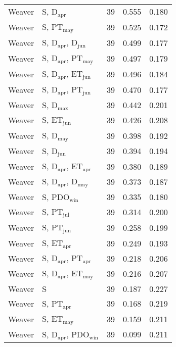 \begin{longtable}{llrrr}
Weaver & S, D$_\mathrm{apr}$ & 39 & 0.555 & 0.180 \\ 
Weaver & S, PT$_\mathrm{may}$ & 39 & 0.525 & 0.172 \\ 
Weaver & S, D$_\mathrm{apr}$, D$_\mathrm{jun}$ & 39 & 0.499 & 0.177 \\ 
Weaver & S, D$_\mathrm{apr}$, PT$_\mathrm{may}$ & 39 & 0.497 & 0.179 \\ 
Weaver & S, D$_\mathrm{apr}$, ET$_\mathrm{jun}$ & 39 & 0.496 & 0.184 \\ 
Weaver & S, D$_\mathrm{apr}$, PT$_\mathrm{jun}$ & 39 & 0.470 & 0.177 \\ 
Weaver & S, D$_\mathrm{max}$ & 39 & 0.442 & 0.201 \\ 
Weaver & S, ET$_\mathrm{jun}$ & 39 & 0.426 & 0.208 \\ 
Weaver & S, D$_\mathrm{may}$ & 39 & 0.398 & 0.192 \\ 
Weaver & S, D$_\mathrm{jun}$ & 39 & 0.394 & 0.194 \\ 
Weaver & S, D$_\mathrm{apr}$, ET$_\mathrm{apr}$ & 39 & 0.380 & 0.189 \\ 
Weaver & S, D$_\mathrm{apr}$, D$_\mathrm{may}$ & 39 & 0.373 & 0.187 \\ 
Weaver & S, PDO$_\mathrm{win}$ & 39 & 0.335 & 0.180 \\ 
Weaver & S, PT$_\mathrm{jul}$ & 39 & 0.314 & 0.200 \\ 
Weaver & S, PT$_\mathrm{jun}$ & 39 & 0.258 & 0.199 \\ 
Weaver & S, ET$_\mathrm{apr}$ & 39 & 0.249 & 0.193 \\ 
Weaver & S, D$_\mathrm{apr}$, PT$_\mathrm{apr}$ & 39 & 0.218 & 0.206 \\ 
Weaver & S, D$_\mathrm{apr}$, ET$_\mathrm{may}$ & 39 & 0.216 & 0.207 \\ 
Weaver & S & 39 & 0.187 & 0.227 \\
Weaver & S, PT$_\mathrm{apr}$ & 39 & 0.168 & 0.219 \\ 
Weaver & S, ET$_\mathrm{may}$ & 39 & 0.159 & 0.211 \\ 
Weaver & S, D$_\mathrm{apr}$, PDO$_\mathrm{win}$ & 39 & 0.099 & 0.211 \\ 
\hline
\end{longtable}
